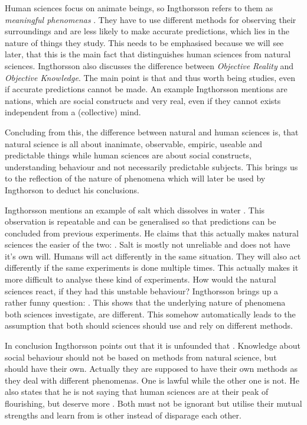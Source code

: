 \documentclass[11pt]{scrartcl}
\begin{document}
Human sciences focus on animate beings, so Ingthorsson refers to them as \textit{meaningful phenomenas} \cite[p. 27]{ingtho}. They have to use different methods for observing their surroundings and are less likely to make accurate predictions, which lies in the nature of things they study. This needs to be emphasised because we will see later, that this is the main fact that distinguishes human sciences from natural sciences. Ingthorsson also discusses the difference between \textit{Objective Reality} and \textit{Objective Knowledge}. The main point is that  \cite[p. 37]{ingtho} and thus worth being studies, even if accurate predictions cannot be made. An example Ingthorsson mentions are nations, which are social constructs and very real, even if they cannot exists independent from a (collective) mind.

Concluding from this, the difference between natural and human sciences is, that natural science is all about inanimate, observable, empiric, useable and predictable things while human sciences are about social constructs, understanding behaviour and not necessarily predictable subjects. This brings us to the reflection of the nature of phenomena which will later be used by Ingthorson to deduct his conclusions.

Ingthorsson mentions an example of salt which dissolves in water \cite[p. 32]{ingtho}. This observation is repeatable and can be generalised so that predictions can be concluded from previous experiments. He claims that this actually makes natural sciences the easier of the two:  \cite[p. 32]{ingtho}. Salt is mostly not unreliable and does not have it's own will. Humans will act differently in the same situation. They will also act differently if the same experiments is done multiple times. This actually makes it more difficult to analyse these kind of experiments. How would the natural sciences react, if they had this unstable behaviour? Ingthorsson brings up a rather funny question:  \cite[p. 33]{ingtho}. This shows that the underlying nature of phenomena both sciences investigate, are different. This somehow automatically leads to the assumption that both should sciences should use and rely on different methods.

In conclusion Ingthorsson points out that it is unfounded that  \cite[p. 40]{ingtho}. Knowledge about social behaviour should not be based on methods from natural science, but should have their own. Actually they are supposed to have their own methods as they deal with different phenomenas. One is lawful while the other one is not. He also states that he is not saying that human sciences are at their peak of flourishing, but deserve more  \cite[p. 41]{ingtho}. Both must not be ignorant but utilise their mutual strengths and learn from is other instead of disparage each other.
\bigbreak
\end{document}
